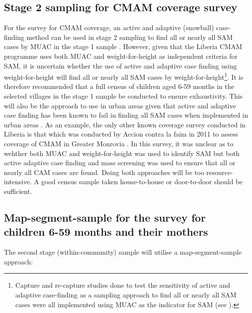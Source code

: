 \documentclass[12pt,a4paper]{book}
\let\rmarkdownfootnote\footnote%
\def\footnote{\protect\rmarkdownfootnote}
\theoremstyle{definition}
\theoremstyle{definition}
\theoremstyle{definition}
\theoremstyle{remark}
\begin{document}
\hypertarget{stage-2-sampling-for-cmam-coverage-survey}{%
\subsection{Stage 2 sampling for CMAM coverage
survey}\label{stage-2-sampling-for-cmam-coverage-survey}}

For the survey for CMAM coverage, an active and adaptive (snowball)
case-finding method can be used in stage 2 sampling to find all or
nearly all SAM cases by MUAC in the stage 1 sample \citep{Myatt:2012tt}.
However, given that the Liberia CMAM programme uses both MUAC and
weight-for-height as independent criteria for SAM, it is uncertain
whether the use of active and adaptive case finding using
weight-for-height will find all or nearly all SAM cases by
weight-for-height\footnote{Capture and re-capture studies done to test
  the sensitivity of active and adaptive case-finding as a sampling
  approach to find all or nearly all SAM cases were all implemented
  using MUAC as the indicator for SAM (see \citep{Wegerdt:2006ux}).}. It
is therefore recommended that a full census of children aged 6-59 months
in the selected villages in the stage 1 sample be conducted to ensure
exhaustivity. This will also be the approach to use in urban areas given
that active and adaptive case finding has been known to fail in finding
all SAM cases when implemented in urban areas \citep{Myatt:2012tt}. As
an example, the only other known coverage survey conducted in Liberia is
that which was conducted by Accion contra la faim in 2011 to assess
coverage of CMAM in Greater Monrovia \citep{AccionContralaFaim:2011vu}.
In this survey, it was unclear as to wehther both MUAC and
weight-for-height was used to identify SAM but both active adaptive case
finding and mass screening was used to ensure that all or nearly all CAM
cases are found. Doing both approaches will be too resource-intensive. A
good census sample taken house-to-house or door-to-door should be
sufficient.

\hypertarget{map-segment-sample-for-the-survey-for-children-6-59-months-and-their-mothers}{%
\subsection{Map-segment-sample for the survey for children 6-59 months
and their
mothers}\label{map-segment-sample-for-the-survey-for-children-6-59-months-and-their-mothers}}

The second stage (within-community) sample will utilise a
map-segment-sample approach:
\end{document}
